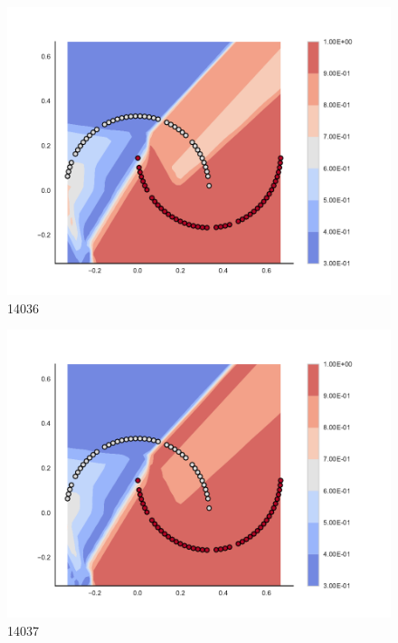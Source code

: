 \begin{subfigure}[b]{0.09\textwidth}
    \includegraphics[clip, trim=2.35cm 1.75cm 4.5cm 0cm,width=\textwidth]{img/convergence/14036.pdf}
    \caption{14036}
    \label{fig:convergence_14036}
\end{subfigure}
%
\begin{subfigure}[b]{0.09\textwidth}
    \includegraphics[clip, trim=2.35cm 1.75cm 4.5cm 0cm,width=\textwidth]{img/convergence/14037.pdf}
    \caption{14037}
    \label{fig:convergence_14037}
\end{subfigure}
%
